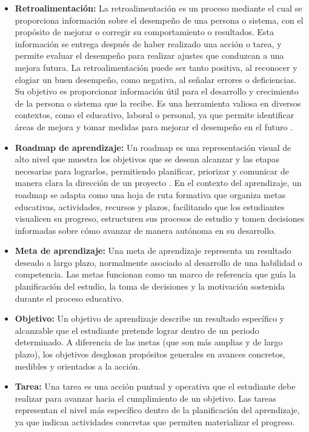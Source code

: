 \begin{itemize}
\item \textbf{Retroalimentación:} La retroalimentación es un proceso mediante el cual se proporciona información sobre el desempeño de una persona o sistema, con el propósito de mejorar o corregir su comportamiento o resultados. Esta información se entrega después de haber realizado una acción o tarea, y permite evaluar el desempeño para realizar ajustes que conduzcan a una mejora futura. La retroalimentación puede ser tanto positiva, al reconocer y elogiar un buen desempeño, como negativa, al señalar errores o deficiencias. Su objetivo es proporcionar información útil para el desarrollo y crecimiento de la persona o sistema que la recibe. Es una herramienta valiosa en diversos contextos, como el educativo, laboral o personal, ya que permite identificar áreas de mejora y tomar medidas para mejorar el desempeño en el futuro \cite{Escuela2024}.

\item \textbf{Roadmap de aprendizaje:} Un roadmap es una representación visual de alto nivel que muestra los objetivos que se desean alcanzar y las etapas necesarias para lograrlos, permitiendo planificar, priorizar y comunicar de manera clara la dirección de un proyecto \cite{MiroRoadmap2025}. En el contexto del aprendizaje, un roadmap se adapta como una hoja de ruta formativa que organiza metas educativas, actividades, recursos y plazos, facilitando que los estudiantes visualicen su progreso, estructuren sus procesos de estudio y tomen decisiones informadas sobre cómo avanzar de manera autónoma en su desarrollo.

\item \textbf{Meta de aprendizaje:} Una meta de aprendizaje representa un resultado deseado a largo plazo, normalmente asociado al desarrollo de una habilidad o competencia. Las metas funcionan como un marco de referencia que guía la planificación del estudio, la toma de decisiones y la motivación sostenida durante el proceso educativo.

\item \textbf{Objetivo:} Un objetivo de aprendizaje describe un resultado específico y alcanzable que el estudiante pretende lograr dentro de un periodo determinado. A diferencia de las metas (que son más amplias y de largo plazo), los objetivos desglosan propósitos generales en avances concretos, medibles y orientados a la acción.

\item \textbf{Tarea:} Una tarea es una acción puntual y operativa que el estudiante debe realizar para avanzar hacia el cumplimiento de un objetivo. Las tareas representan el nivel más específico dentro de la planificación del aprendizaje, ya que indican actividades concretas que permiten materializar el progreso.


\end{itemize}
